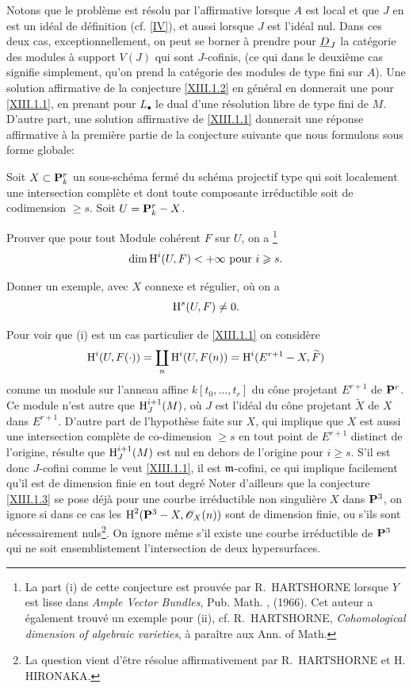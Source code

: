 Notons que le probl\`eme est r\'esolu par l'affirmative lorsque $A$ est local et que $J$ en est un id\'eal de d\'efinition (cf. \Exp \ref{IV}), et aussi lorsque $J$ est l'id\'eal nul. Dans ces deux cas, exceptionnellement, on peut se borner \`a prendre pour ${\underline{D}_J}$ la cat\'egorie des modules \`a support $V(J)$ qui sont $J$-cofinis, (ce qui dans le deuxi\`eme cas signifie simplement, qu'on prend la cat\'egorie des modules de type fini sur $A$). Une solution affirmative de la conjecture \ref{XIII.1.2} en g\'en\'eral en donnerait une pour \ref{XIII.1.1}, en prenant pour $L_{\bullet}$ le dual d'une r\'esolution libre de type fini de $M$. D'autre part, une solution affirmative de \ref{XIII.1.1} donnerait une r\'eponse affirmative \`a la premi\`ere partie de la conjecture suivante que nous formulons sous forme \og globale\fg:

\begin{conjecture} \label{XIII.1.3}
Soit $X\subset {\mathbf P}^r_k$ un sous-sch\'ema ferm\'e du sch\'ema projectif type qui soit localement une intersection compl\`ete et dont toute composante irr\'eductible soit de codimension $\ge s$. Soit $U={\mathbf P}^r_k -X$.
\begin{enumeratei}
\item
Prouver que pour tout Module coh\'erent $F$ sur $U$, on a
\footnote{La part (i) de cette conjecture est prouv\'ee par R.~HARTSHORNE lorsque $Y$ est lisse dans \emph{Ample Vector Bundles}, Pub. Math. , (1966). Cet auteur a \'egalement trouv\'e un exemple pour (ii), cf. R.~HARTSHORNE, \emph{Cohomological dimension of algebraic varieties}, \`a para\^itre aux Ann. of Math.}$$
\dim \operatorname{H}^i(U, F)<+\infty{\rm \ pour\ } i\geqslant s.{}
$$

\item
Donner un exemple, avec $X$ connexe et r\'egulier, o\`u on a
$$
\operatorname{H}^s(U, F)\neq 0.
$$
\end{enumeratei}
\end{conjecture}

Pour voir que (i) est un cas particulier de \ref{XIII.1.1} on consid\`ere
$$
\operatorname{H}^i(U, F(\cdot))=\coprod_n \operatorname{H}^i (U, F(n))= \operatorname{H}^i(E^{r+1} -X, \widetilde{F})$$
comme un module sur l'anneau affine $k[t_0, \ldots, t_r]$ du c\^{o}ne projetant $E^{r+1}$ de ${\mathbf P}^r$. Ce module n'est autre que $\operatorname{H}_J^{i+1}(M)$, o\`u $J$ est l'id\'eal du c\^{o}ne projetant $\tilde X$ de $X$ dans $E^{r+1}$. D'autre part de l'hypoth\`ese faite sur $X$, qui implique que $X$ est aussi une intersection compl\`ete de co-dimension $\ge s$ en tout point de $E^{r+1}$ distinct de l'origine, r\'esulte que $\operatorname{H}^{i+1}_J(M)$ est nul en dehors de l'origine pour $i\ge s$. S'il est donc $J$-cofini comme le veut \ref{XIII.1.1}, il est \afortiori $\mathfrak{m}$-cofini, ce qui implique facilement qu'il est de dimension finie en tout degr\'e Noter d'ailleurs que la conjecture \ref{XIII.1.3} se pose d\'ej\`a pour une courbe irr\'eductible non singuli\`ere $X$ dans ${\mathbf P}^3$, on ignore si dans ce cas les $\operatorname{H}^2({\mathbf P}^3-X, \mathscr{O}_X(n))$ sont de dimension finie, ou s'ils sont n\'ecessairement nuls\footnote{La question vient d'\^etre r\'esolue affirmativement par R.\, HARTSHORNE et H. HIRONAKA.}. On ignore m\^eme s'il existe une courbe irr\'eductible de ${\mathbf P}^3$ qui ne soit ensemblistement l'intersection de deux hypersurfaces\label{courbesurface}.

